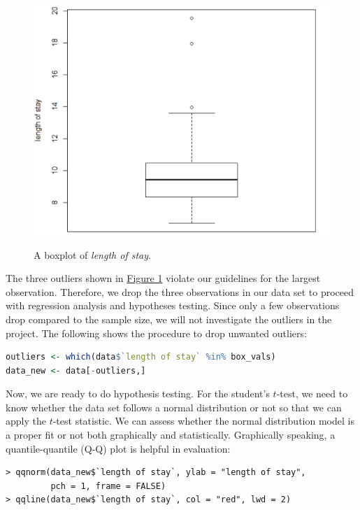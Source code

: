 \documentclass[11pt]{article}
\begin{document}
\begin{figure}[h!]
\begin{center}\label{boxplot}
\includegraphics[scale=0.5]{boxplot}
\end{center}\caption{A boxplot of \textit{length of stay}.}
\end{figure}

\noindent The three outliers shown in \hyperref[boxplot]{Figure 1} violate our guidelines for the largest observation. Therefore, we drop the three observations in our data set to proceed with regression analysis and hypotheses testing. Since only a few observations drop compared to the sample size, we will not investigate the outliers in the project. The following shows the procedure to drop unwanted outliers:
\begin{file}[hospital.r]
\begin{lstlisting}[language = R]
outliers <- which(data$`length of stay` %in% box_vals)
data_new <- data[-outliers,]
\end{lstlisting}
\end{file}

Now, we are ready to do hypothesis testing. For the student's $t$-test, we need to know whether the data set follows a normal distribution or not
so that we can apply the $t$-test statistic. We can assess whether the normal distribution model is a proper fit or not both graphically and statistically. Graphically speaking, a quantile-quantile (Q-Q) plot is helpful in evaluation:

\begin{commandline}
\begin{verbatim}
> qqnorm(data_new$`length of stay`, ylab = "length of stay",
         pch = 1, frame = FALSE)
> qqline(data_new$`length of stay`, col = "red", lwd = 2)
\end{verbatim}
\end{commandline}
\end{document}
